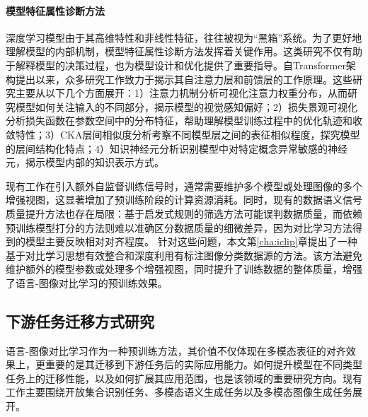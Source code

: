 \paragraph{模型特征属性诊断方法} 深度学习模型由于其高维特性和非线性特征，往往被视为“黑箱”系统。为了更好地理解模型的内部机制，模型特征属性诊断方法发挥着关键作用\cite{yosinski2014transferable}。这类研究不仅有助于解释模型的决策过程，也为模型设计和优化提供了重要指导。自Transformer架构提出以来，众多研究工作\cite{zhou2021deepvit, dosovitskiy2020vit, goh2021multimodal, dai-etal-2022-knowledge, imagnettransfer, raghu2021vision}致力于揭示其自注意力层和前馈层的工作原理。这些研究主要从以下几个方面展开：1）注意力机制分析\cite{zhou2021deepvit, dosovitskiy2020vit}可视化注意力权重分布，从而研究模型如何关注输入的不同部分，揭示模型的视觉感知偏好；2）损失景观可视化\cite{li2018visualizing}分析损失函数在参数空间中的分布特征，帮助理解模型训练过程中的优化轨迹和收敛特性；3）CKA层间相似度分析\cite{kornblith2019similarity}考察不同模型层之间的表征相似程度，探究模型的层间结构化特点；4）知识神经元分析\cite{dai-etal-2022-knowledge, goh2021multimodal}识别模型中对特定概念异常敏感的神经元，揭示模型内部的知识表示方式。

现有工作在引入额外自监督训练信号时，通常需要维护多个模型\cite{TCL,MaskCLIP}或处理图像的多个增强视图\cite{SLIP,TCL,li2022supervision}，这显著增加了预训练阶段的计算资源消耗。同时，现有的数据语义信号质量提升方法也存在局限：基于启发式规则的筛选方法\cite{sharma-etal-2018-conceptual}可能误判数据质量，而依赖预训练模型打分的方法\cite{schuhmann2021laion400m}则难以准确区分数据质量的细微差异，因为对比学习方法得到的模型主要反映相对对齐程度。
针对这些问题，本文第\ref{cha:iclip}章提出了一种基于对比学习思想有效整合和深度利用有标注图像分类数据源的方法。该方法避免维护额外的模型参数或处理多个增强视图，同时提升了训练数据的整体质量，增强了语言-图像对比学习的预训练效果。

\subsection{下游任务迁移方式研究}
语言-图像对比学习作为一种预训练方法，其价值不仅体现在多模态表征的对齐效果上，更重要的是其迁移到下游任务后的实际应用能力。如何提升模型在不同类型任务上的迁移性能，以及如何扩展其应用范围，也是该领域的重要研究方向。现有工作主要围绕开放集合识别任务、多模态语义生成任务以及多模态图像生成任务展开。

